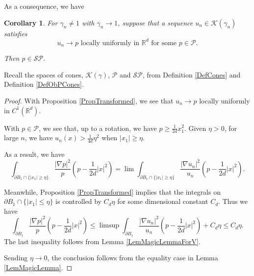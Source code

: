 \documentclass{amsart}
\def\R {\mathbb{R}}
\def\PB{\partial B_1}
\def\KGa{\mathcal{K}(\gamma)}
\def\K{\mathcal{K}}
\def\P{\mathcal{P}}
\def\SP{\mathcal{SP}}
\newtheorem{cor}[thm]{Corollary}
\theoremstyle{definition}
\numberwithin{equation}{section}
\theoremstyle{remark}
\begin{document}
As a consequence, we have
\begin{cor}
\label{CorConcentration}
For $\gamma_n\neq 1$ with $\gamma_n\to 1$, suppose that a sequence $u_n\in\K(\gamma_n)$ satisfies
$$
u_n\to p \text{ locally uniformly in }\R^d \text{ for some }p\in\P.
$$

Then $p\in\SP$.
\end{cor} 
Recall the spaces of cones, $\KGa$, $\P$ and $\SP$, from Definition \ref{DefCones} and Definition \ref{DefObPCones}.
\begin{proof}
With Proposition \ref{PropTransformed}, we see that $u_n\to p$ locally  uniformly in $C^1(\R^d)$.

With $p\in\P$, we see that, up to a rotation, we have
$
p\ge\frac{1}{2d}x_1^2.
$
Given $\eta>0$, for large $n$, we have $u_n(x)>\frac{1}{4d}\eta^2$ when $|x_1|\ge\eta$. 

As a result,  we have
$$
\int_{\PB\cap\{|x_1|\ge\eta\}}\frac{|\nabla p|^2}{p}(p-\frac{1}{2d}|x|^2)=\lim\int_{\PB\cap\{|x_1|\ge\eta\}}\frac{|\nabla u_n|^2}{u_n}(p-\frac{1}{2d}|x|^2).
$$

Meanwhile, Proposition \ref{PropTransformed} implies that the integrals on $\PB\cap\{|x_1|\le\eta\}$ is controlled by $C_d\eta$ for some dimensional constant $C_d$.  Thus we have
$$
\int_{\PB}\frac{|\nabla p|^2}{p}(p-\frac{1}{2d}|x|^2)\le\limsup\int_{\PB}\frac{|\nabla u_n|^2}{u_n}(p-\frac{1}{2d}|x|^2)+C_d\eta\le C_d\eta.
$$
The last inequality follows from Lemma \ref{LemMagicLemmaForV}.

Sending $\eta\to0$, the conclusion follows from the equality case in Lemma \ref{LemMagicLemma}.
\end{proof} 
\end{document}

